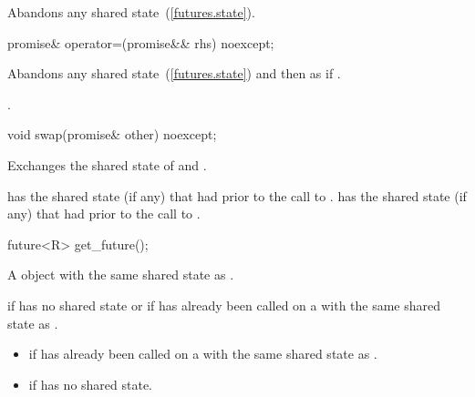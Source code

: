 \begin{itemdescr}
\pnum
\effects
Abandons any shared state~(\ref{futures.state}).
\end{itemdescr}

%
%
\begin{itemdecl}
promise& operator=(promise&& rhs) noexcept;
\end{itemdecl}

\begin{itemdescr}
\pnum
\effects
Abandons any shared state~(\ref{futures.state}) and then as if
.

\pnum
\returns {}.
\end{itemdescr}

%
%
\begin{itemdecl}
void swap(promise& other) noexcept;
\end{itemdecl}

\begin{itemdescr}
\pnum
\effects Exchanges the shared state of  and .

\pnum
\postcondition {} has the shared state (if any) that  had
prior to the call to .  has the shared state (if any) that
 had prior to the call to .
\end{itemdescr}

%
%
\begin{itemdecl}
future<R> get_future();
\end{itemdecl}

\begin{itemdescr}
\pnum
\returns A  object with the same shared state as
.

\pnum
\throws {} if  has no shared state or if
 has already been called on a  with the same
shared state as .

\pnum
\errors

\begin{itemize}
\item {} if  has already been called on
a  with the same shared state as .

\item {} if  has no shared state.
\end{itemize}
\end{itemdescr}

